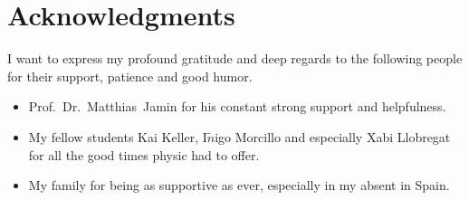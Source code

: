 \chapter{Acknowledgments}
I want to express my profound gratitude and deep regards to the following people for their support, patience and good humor.
\begin{itemize}
	\item Prof.~Dr.~Matthias~Jamin for his constant strong support and helpfulness.
	\item My fellow students Kai Keller, I$\tilde n$igo Morcillo and especially Xabi Llobregat for all the good times physic had to offer. 
	\item My family for being as supportive as ever, especially in my absent in Spain.
\end{itemize}
